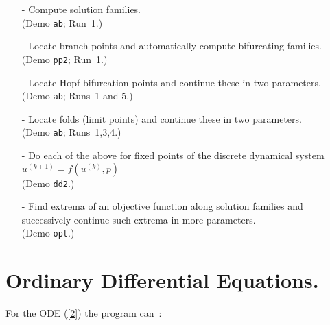 \documentclass[12pt]{report}
\begin{document}
\begin{itemize}
\item[-]
  Compute solution families.\\  (Demo {\tt ab}; Run~1.) 
\item[-]
  Locate branch points and automatically compute
  bifurcating families. \\ (Demo {\tt pp2}; Run~1.)
\item[-]
  Locate Hopf bifurcation points and continue these in two
  parameters. \\ (Demo {\tt ab}; Runs~1 and 5.)
\item[-]
  Locate folds (limit points) and continue these 
  in two parameters. \\(Demo {\tt ab}; Runs~1,3,4.)
\item[-]
  Do each of the above for fixed points
  of the discrete dynamical system 
  $u^{(k+1)}= f( u^{(k)}, p )$ \\ (Demo {\tt dd2}.)
\item[-]
  Find extrema of an objective function along solution families
  and successively continue such extrema in more parameters.
  \\ (Demo {\tt opt}.)
\end{itemize}


\section{ Ordinary Differential Equations.} \label{sec:ODEs}
For the ODE (\ref{2}) the program can~:~
 
\end{document}
